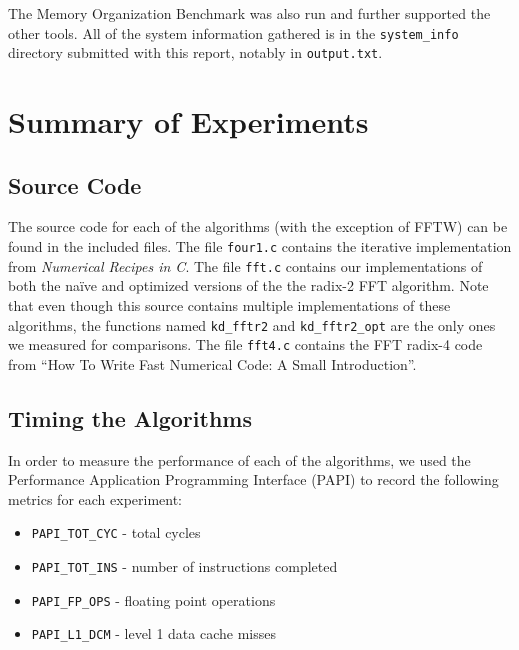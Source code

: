 \documentclass[11 pt]{article}
\begin{document}
The Memory Organization Benchmark \cite{mob} was also run and further supported
the other tools. All of the system information gathered is in the
\texttt{system\_info} directory submitted with this report, notably in
\texttt{output.txt}.

\section{Summary of Experiments}

\subsection{Source Code}
The source code for each of the algorithms (with the exception of FFTW) can be
found in the included files.  The file {\tt four1.c} contains the iterative
implementation from \emph{Numerical Recipes in C}.  The file {\tt fft.c}
contains our implementations of both the na\"{i}ve and optimized versions of the
the radix-2 FFT algorithm.  Note that even though this source contains multiple
implementations of these algorithms, the functions named {\tt kd\_fftr2} and
{\tt kd\_fftr2\_opt} are the only ones we measured for comparisons.  The file
{\tt fft4.c} contains the FFT radix-4 code from ``How To Write Fast Numerical
Code: A Small Introduction''.

\subsection{Timing the Algorithms}

In order to measure the performance of each of the algorithms, we used the
Performance Application Programming Interface (PAPI) to record the following
metrics for each experiment:

\begin{itemize}
\item {\tt PAPI\_TOT\_CYC} - total cycles
\item {\tt PAPI\_TOT\_INS} - number of instructions completed
\item {\tt PAPI\_FP\_OPS}  - floating point operations
\item {\tt PAPI\_L1\_DCM}  - level 1 data cache misses
\end{itemize}
\end{document}
